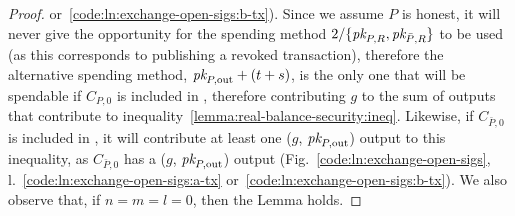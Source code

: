 \begin{proof}
  or~\ref{code:ln:exchange-open-sigs:b-tx}). Since we assume $P$ is honest, it
  will never give the opportunity for the spending method $2/\{\textit{pk}_{P, R},
  \textit{pk}_{\bar{P}, R}\}$ to be used (as this corresponds to publishing a revoked
  transaction), therefore the alternative spending method, $\textit{pk}_{P, \mathrm{out}}
  + (t + s)$, is the only one that will be spendable if $C_{P, 0}$ is included
  in \ledger, therefore contributing $g$ to the sum of outputs that contribute
  to inequality~\ref{lemma:real-balance-security:ineq}.  Likewise, if
  $C_{\bar{P}, 0}$ is included in \ledger, it will contribute at least one ($g$,
  $\textit{pk}_{P, \mathrm{out}}$) output to this inequality, as $C_{\bar{P}, 0}$ has a
  ($g$, $\textit{pk}_{P, \mathrm{out}}$) output (Fig.~\ref{code:ln:exchange-open-sigs},
  l.~\ref{code:ln:exchange-open-sigs:a-tx}
  or~\ref{code:ln:exchange-open-sigs:b-tx}). We also observe that, if $n = m = l
  = 0$, then the Lemma holds.
\end{proof}
